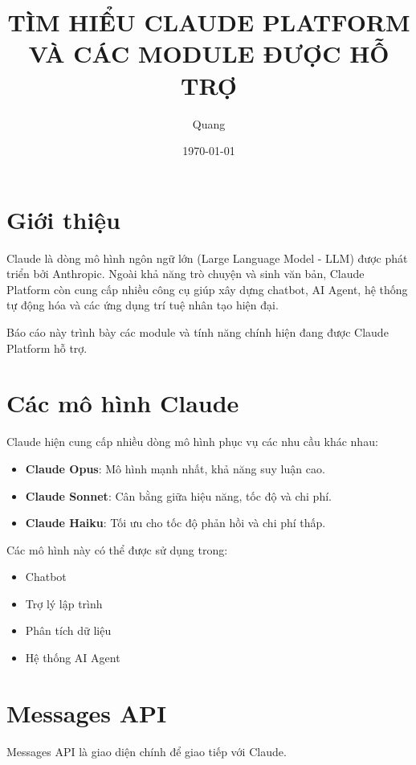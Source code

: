 \documentclass[12pt]{article}
\title{TÌM HIỂU CLAUDE PLATFORM VÀ CÁC MODULE ĐƯỢC HỖ TRỢ}
\author{Quang}
\date{\today}
\begin{document}
\maketitle

\tableofcontents
\newpage

\section{Giới thiệu}

Claude là dòng mô hình ngôn ngữ lớn (Large Language Model - LLM) được phát triển bởi Anthropic. Ngoài khả năng trò chuyện và sinh văn bản, Claude Platform còn cung cấp nhiều công cụ giúp xây dựng chatbot, AI Agent, hệ thống tự động hóa và các ứng dụng trí tuệ nhân tạo hiện đại.

Báo cáo này trình bày các module và tính năng chính hiện đang được Claude Platform hỗ trợ.

\section{Các mô hình Claude}

Claude hiện cung cấp nhiều dòng mô hình phục vụ các nhu cầu khác nhau:

\begin{itemize}
    \item \textbf{Claude Opus}: Mô hình mạnh nhất, khả năng suy luận cao.
    \item \textbf{Claude Sonnet}: Cân bằng giữa hiệu năng, tốc độ và chi phí.
    \item \textbf{Claude Haiku}: Tối ưu cho tốc độ phản hồi và chi phí thấp.
\end{itemize}

Các mô hình này có thể được sử dụng trong:

\begin{itemize}
    \item Chatbot
    \item Trợ lý lập trình
    \item Phân tích dữ liệu
    \item Hệ thống AI Agent
\end{itemize}

\section{Messages API}

Messages API là giao diện chính để giao tiếp với Claude.
\end{document}
